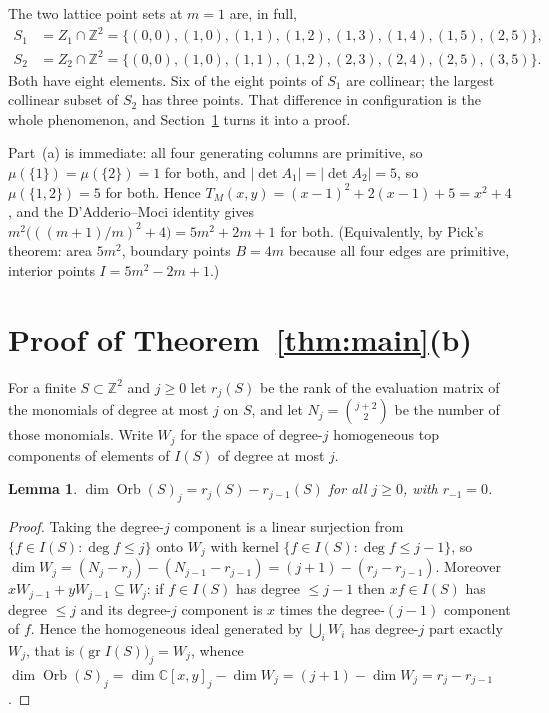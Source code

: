 \documentclass[11pt]{amsart}
\newtheorem{lemma}[theorem]{Lemma}
\theoremstyle{definition}
\newcommand{\Z}{\mathbb Z}
\newcommand{\C}{\mathbb C}
\newcommand{\Orb}{\operatorname{Orb}}
\newcommand{\grI}{\operatorname{gr}}
\newcommand{\Zone}{Z_1}
\newcommand{\Ztwo}{Z_2}
\begin{document}
The two lattice point sets at $m=1$ are, in full,
\begin{align}
 S_1&=\Zone\cap\Z^2=\{(0,0),(1,0),(1,1),(1,2),(1,3),(1,4),(1,5),(2,5)\},\label{eq:S1}\\
 S_2&=\Ztwo\cap\Z^2=\{(0,0),(1,0),(1,1),(1,2),(2,3),(2,4),(2,5),(3,5)\}.\label{eq:S2}
\end{align}
Both have eight elements. Six of the eight points of $S_1$ are collinear; the largest collinear
subset of $S_2$ has three points. That difference in configuration is the whole phenomenon, and
Section~\ref{sec:proof} turns it into a proof.

Part~(a) is immediate: all four generating columns are primitive, so
$\mu(\{1\})=\mu(\{2\})=1$ for both, and $|\det A_1|=|\det A_2|=5$, so $\mu(\{1,2\})=5$ for both.
Hence
$T_M(x,y)=(x-1)^2+2(x-1)+5=x^2+4$, and the D'Adderio--Moci identity gives
$m^2\bigl(((m+1)/m)^2+4\bigr)=5m^2+2m+1$ for both. (Equivalently, by Pick's theorem: area $5m^2$,
boundary points $B=4m$ because all four edges are primitive, interior points $I=5m^2-2m+1$.)

\section{Proof of Theorem~\ref{thm:main}(b)}\label{sec:proof}

For a finite $S\subset\Z^2$ and $j\ge0$ let $r_j(S)$ be the rank of the evaluation matrix of the
monomials of degree at most $j$ on $S$, and let $N_j=\binom{j+2}{2}$ be the number of those
monomials. Write $W_j$ for the space of degree-$j$ homogeneous top components of elements of
$I(S)$ of degree at most $j$.

\begin{lemma}\label{lem:diff}
$\dim\Orb(S)_j=r_j(S)-r_{j-1}(S)$ for all $j\ge0$, with $r_{-1}=0$.
\end{lemma}

\begin{proof}
Taking the degree-$j$ component is a linear surjection from $\{f\in I(S):\deg f\le j\}$ onto
$W_j$ with kernel $\{f\in I(S):\deg f\le j-1\}$, so
$\dim W_j=(N_j-r_j)-(N_{j-1}-r_{j-1})=(j+1)-(r_j-r_{j-1})$. Moreover $xW_{j-1}+yW_{j-1}\subseteq W_j$: if
$f\in I(S)$ has degree $\le j-1$ then $xf\in I(S)$ has degree $\le j$ and its degree-$j$
component is $x$ times the degree-$(j-1)$ component of $f$. Hence the homogeneous ideal generated
by $\bigcup_iW_i$ has degree-$j$ part exactly $W_j$, that is
$\bigl(\grI I(S)\bigr)_j=W_j$, whence
$\dim\Orb(S)_j=\dim\C[x,y]_j-\dim W_j=(j+1)-\dim W_j=r_j-r_{j-1}$.
\end{proof}
\end{document}
